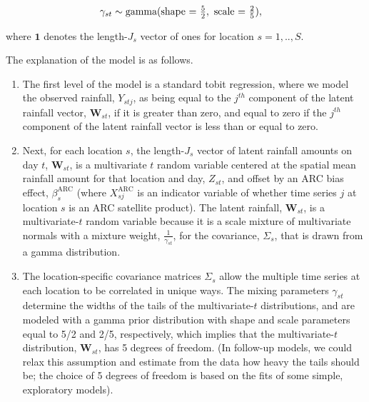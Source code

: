 \documentclass[12pt]{article}
\def\bW{\pmb{W}}
\begin{document}
$\hspace{1.3in}
\gamma_{st} \sim \text{gamma}(\text{shape = } \frac{5}{2}, \text{ scale = } \frac{2}{5}),
$


where $\mathbf{1}$ denotes the length-$J_s$ vector of ones for location $s = 1, .., S$.

The explanation of the model is as follows.
\begin{enumerate}
\item The first level of the model is a standard tobit regression, where we model the observed rainfall, $Y_{stj}$, as being equal to the $j^{th}$ component of the latent rainfall vector, $\bW_{st}$, if it is greater than zero, and equal to zero if the $j^{th}$ component of the latent rainfall vector is less than or equal to zero.
\item Next, for each location $s$, the length-$J_s$ vector of latent rainfall amounts on day $t$, $\bW_{st}$, is a multivariate $t$ random variable centered at the spatial mean rainfall amount for that location and day, $Z_{st}$, and offset by an ARC bias effect, $\beta_s^\text{ARC}$ (where $X^\text{ARC}_{sj}$ is an indicator variable of whether time series $j$ at location $s$ is an ARC satellite product). The latent rainfall, $\bW_{st}$, is a multivariate-$t$ random variable because it is a scale mixture of multivariate normals with a mixture weight, $\frac{1}{\gamma_{st}}$, for the covariance, $\Sigma_s$, that is drawn from a gamma distribution.
\item The location-specific covariance matrices $\Sigma_s$ allow the multiple time series at each location to be correlated in unique ways. The mixing parameters $\gamma_{st}$ determine the widths of the tails of the multivariate-$t$ distributions, and are modeled with a gamma prior distribution with shape and scale parameters equal to 5/2 and 2/5, respectively, which implies that the multivariate-$t$ distribution, $\bW_{st}$, has 5 degrees of freedom. (In follow-up models, we could relax this assumption and estimate from the data how heavy the tails should be; the choice of 5 degrees of freedom is based on the fits of some simple, exploratory models).

\end{enumerate}
\end{document}
